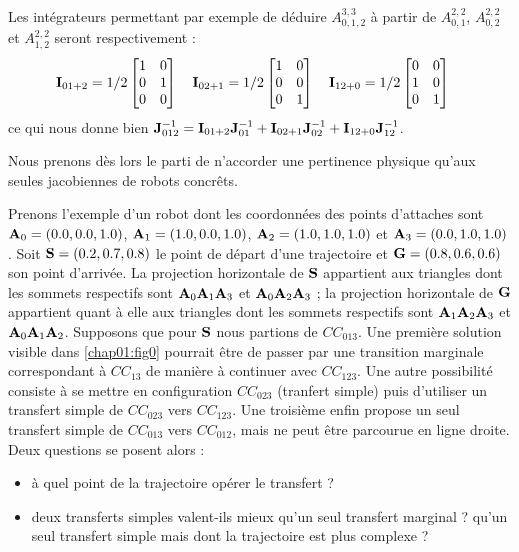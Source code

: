 Les int\'egrateurs permettant par exemple de d\'eduire $A^{3,3}_{0, 1, 2}$ \`a 
partir de $A^{2,2}_{0, 1}$, $A^{2,2}_{0, 2}$ et $A^{2,2}_{1,2}$ seront 
respectivement :
\begin{equation}
{\bf I}_{01+2} = 1/2
\begin{bmatrix}
1 & 0 \\
0 & 1 \\
0 & 0
\end{bmatrix}
\quad
{\bf I}_{02+1} = 1/2
\begin{bmatrix}
1 & 0 \\
0 & 0 \\
0 & 1
\end{bmatrix}
\quad
{\bf I}_{12+0} = 1/2
\begin{bmatrix}
0 & 0 \\
1 & 0 \\
0 & 1
\end{bmatrix}
\label{chap01:eq04} \quad
\end{equation}
ce qui nous donne bien ${\bf J}^{-1}_{012} = {\bf I}_{01+2} {\bf J}^{-1}_{01} + 
{\bf I}_{02+1} {\bf J}^{-1}_{02} + {\bf I}_{12+0} {\bf J}^{-1}_{12}$.

Nous prenons d\`es lors le parti de n'accorder une pertinence physique qu'aux 
seules jacobiennes de robots concr\^ets.

Prenons l'exemple d'un robot dont les coordonn\'ees des points d'attaches sont 
${\bf A}_0 = (0.0, 0.0, 1.0)$, ${\bf A}_1 = (1.0, 0.0, 1.0)$, ${\bf A}_2 = 
(1.0, 1.0, 1.0)$ et ${\bf A}_3 = (0.0, 1.0, 1.0)$. Soit ${\bf S} = (0.2, 0.7, 
0.8)$ le point de d\'epart d'une trajectoire et ${\bf G} = (0.8, 0.6, 0.6)$ son 
point d'arriv\'ee. La projection horizontale de ${\bf S}$ appartient aux 
triangles dont les sommets respectifs sont ${\bf A}_0{\bf A}_1{\bf A}_3$ et 
${\bf A}_0{\bf A}_2{\bf A}_3$ ; la projection horizontale de ${\bf G}$ 
appartient quant \`a elle aux triangles dont les sommets respectifs sont ${\bf 
A}_1{\bf A}_2{\bf A}_3$ et ${\bf A}_0{\bf A}_1{\bf A}_2$. Supposons que pour 
${\bf S}$ nous partions de $CC_{013}$. Une premi\`ere solution visible 
dans \ref{chap01:fig0} pourrait \^etre de passer par une transition marginale 
correspondant \`a $CC_{13}$ de mani\`ere \`a continuer avec $CC_{123}$. Une 
autre possibilit\'e consiste \`a se mettre en configuration $CC_{023}$ 
(tranfert simple) puis d'utiliser un transfert simple de $CC_{023}$ vers 
$CC_{123}$. Une troisi\`eme enfin propose un seul transfert simple de 
$CC_{013}$ vers $CC_{012}$, mais ne peut \^etre parcourue en ligne droite. Deux 
questions se posent alors :
\begin{itemize}
 \item \`a quel point de la trajectoire op\'erer le transfert ?
  \item  deux transferts simples valent-ils mieux qu'un seul transfert marginal 
? qu'un seul transfert simple mais dont la trajectoire est plus complexe ? 
\end{itemize}

